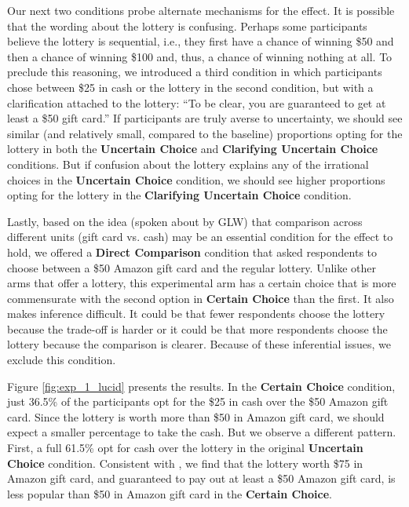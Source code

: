 \documentclass[12pt, letterpaper]{article}
\begin{document}
Our next two conditions probe alternate mechanisms for the effect. It is possible that the wording about the lottery is confusing. Perhaps some participants believe the lottery is sequential, i.e., they first have a chance of winning \$50 and then a chance of winning \$100 and, thus, a chance of winning nothing at all. To preclude this reasoning, we introduced a third condition in which participants chose between \$25 in cash or the lottery in the second condition, but with a clarification attached to the lottery: ``To be clear, you are guaranteed to get at least a \$50 gift card.'' If participants are truly averse to uncertainty, we should see similar (and relatively small, compared to the baseline) proportions opting for the lottery in both the \textbf{Uncertain Choice} and \textbf{Clarifying Uncertain Choice} conditions. But if confusion about the lottery explains any of the irrational choices in the \textbf{Uncertain Choice} condition, we should see higher proportions opting for the lottery in the \textbf{Clarifying Uncertain Choice} condition.

Lastly, based on the idea (spoken about by GLW) that comparison across different units (gift card vs. cash) may be an essential condition for the effect to hold, we offered a \textbf{Direct Comparison} condition that asked respondents to choose between a \$50 Amazon gift card and the regular lottery. Unlike other arms that offer a lottery, this experimental arm has a certain choice that is more commensurate with the second option in \textbf{Certain Choice} than the first. It also makes inference difficult. It could be that fewer respondents choose the lottery because the trade-off is harder or it could be that more respondents choose the lottery because the comparison is clearer. Because of these inferential issues, we exclude this condition.

Figure \ref{fig:exp_1_lucid} presents the results. In the \textbf{Certain Choice} condition, just 36.5\% of the participants opt for the \$25 in cash over the \$50 Amazon gift card. Since the lottery is worth more than \$50 in Amazon gift card, we should expect a smaller percentage to take the cash. But we observe a different pattern. First, a full 61.5\% opt for cash over the lottery in the original \textbf{Uncertain Choice} condition. Consistent with \citet{gneezy2006uncertainty}, we find that the lottery worth \$75 in Amazon gift card, and guaranteed to pay out at least a \$50 Amazon gift card, is less popular than \$50 in Amazon gift card in the \textbf{Certain Choice}.
\end{document}
